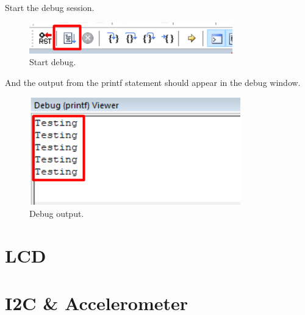 \documentclass{article}
\begin{document}
Start the debug session.
\begin{figure}[H]
    \centering
    \includegraphics[width=0.5\linewidth]{pics/RunDebugSession.png}
    \caption{Start debug.}
    \label{fig:StartDebugger}
\end{figure}

\newpage

And the output from the printf statement should appear in the debug window.
\begin{figure}[H]
    \centering
    \includegraphics[width=0.5\linewidth]{pics/DebugOutput.png}
    \caption{Debug output.}
    \label{fig:DebugOutput}
\end{figure}

\section{LCD}

\section{I2C \& Accelerometer}


    
    




\end{document}
